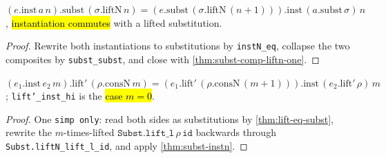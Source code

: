 \begin{theorem}
\label{thm:subst-instn}
\leanok
{} 

$(e.\mathrm{inst}\,a\,n).\mathrm{subst}\,(\sigma.\mathrm{liftN}\,n) = (e.\mathrm{subst}\,(\sigma.\mathrm{liftN}\,(n{+}1))).\mathrm{inst}\,(a.\mathrm{subst}\,\sigma)\,n$,
\hl{instantiation commutes} with a lifted substitution.
\end{theorem}
\begin{proof}
\leanok
{} Rewrite both instantiations to substitutions by \texttt{instN\_eq}, collapse
the two composites by \texttt{subst\_subst}, and close with \ref{thm:subst-comp-liftn-one}.
\end{proof}

\begin{theorem}
\label{thm:lift-instn-hi}
\leanok
{} 

$(e_1.\mathrm{inst}\,e_2\,m).\mathrm{lift}'\,(\rho.\mathrm{consN}\,m) = (e_1.\mathrm{lift}'\,(\rho.\mathrm{consN}\,(m{+}1))).\mathrm{inst}\,(e_2.\mathrm{lift}'\,\rho)\,m$;
\texttt{lift'\_inst\_hi} is the \hl{case $m=0$}.
\end{theorem}
\begin{proof}
\leanok
{} One \texttt{simp only}: read both sides as substitutions by
\ref{thm:lift-eq-subst}, rewrite the $m$-times-lifted
$\texttt{Subst.lift\_l}\,\rho\,\texttt{id}$ backwards through
\texttt{Subst.liftN\_lift\_l\_id}, and apply \ref{thm:subst-instn}.
\end{proof}

